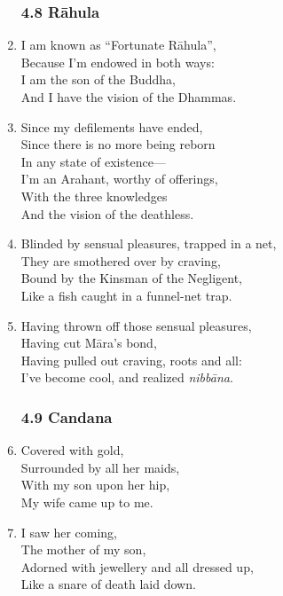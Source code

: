 \documentclass[10pt, openany]{book}
\begin{document}
\begin{enumerate}
\subsubsection*{4.8 Rāhula}

\item I am known as “Fortunate Rāhula”,\\
Because I’m endowed in both ways:\\
I am the son of the Buddha,\\
And I have the vision of the Dhammas.

\item Since my defilements have ended,\\
Since there is no more being reborn \\
In any state of existence—\\
I’m an Arahant, worthy of offerings,\\
With the three knowledges \\
And the vision of the deathless.

\item Blinded by sensual pleasures, trapped in a net,\\
They are smothered over by craving,\\
Bound by the Kinsman of the Negligent,\\
Like a fish caught in a funnel-net trap.

\item Having thrown off those sensual pleasures,\\
Having cut Māra’s bond,\\
Having pulled out craving, roots and all:\\
I’ve become cool, and realized \emph{nibbāna}.

\subsubsection*{4.9 Candana}

\item Covered with gold,\\
Surrounded by all her maids,\\
With my son upon her hip,\\
My wife came up to me.

\item I saw her coming,\\
The mother of my son,\\
Adorned with jewellery and all dressed up,\\
Like a snare of death laid down.


\end{enumerate}
\end{document}
